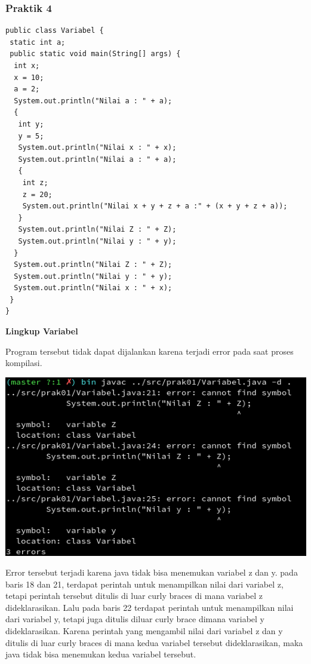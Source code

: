 \documentclass[a4paper,12pt]{article}
\begin{document}
\subsubsection{Praktik 4}
\begin{lstlisting}
public class Variabel {
 static int a;
 public static void main(String[] args) {
  int x;
  x = 10;
  a = 2;
  System.out.println("Nilai a : " + a);
  {
   int y;
   y = 5;
   System.out.println("Nilai x : " + x);
   System.out.println("Nilai a : " + a);
   {
    int z;
    z = 20;
    System.out.println("Nilai x + y + z + a :" + (x + y + z + a));
   }
   System.out.println("Nilai Z : " + Z);
   System.out.println("Nilai y : " + y);
  }
  System.out.println("Nilai Z : " + Z);
  System.out.println("Nilai y : " + y);
  System.out.println("Nilai x : " + x);
 }
}
\end{lstlisting}

\textbf{Lingkup Variabel}

Program tersebut tidak dapat dijalankan karena terjadi error
pada saat proses kompilasi.

\begin{center}
    \includegraphics[width=\textwidth]{6.png}
\end{center}

Error tersebut terjadi karena java tidak bisa menemukan variabel z dan y.
pada baris 18 dan 21, terdapat perintah untuk menampilkan nilai dari variabel z,
tetapi perintah tersebut ditulis di luar curly braces di mana variabel z
dideklarasikan. Lalu pada baris 22 terdapat perintah untuk menampilkan nilai
dari variabel y, tetapi juga ditulis diluar curly brace dimana variabel y 
dideklarasikan. Karena perintah yang mengambil nilai dari variabel z dan y
ditulis di luar curly braces di mana kedua variabel tersebut dideklarasikan,
maka java tidak bisa menemukan kedua variabel tersebut.\\
\end{document}
